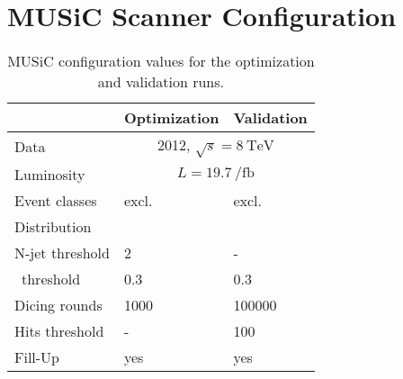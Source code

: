 \section*{MUSiC Scanner Configuration}
\begin{table}
	\centering
	\begin{tabular}{ l l l }
		\toprule
		& Optimization & Validation \\ 
		\midrule
		Data & \multicolumn{2}{c|}{2012, $\sqrt{s} = \SI{8}{\TeV}$} \\ 
		Luminosity & \multicolumn{2}{c|}{ $L = \SI{19.7}{\per\femto\barn}$ } \\ 
		\midrule
		Event classes & excl. & excl. \\ 
		Distribution & \sumpT & \Minv \\
		N-jet threshold & \num{2} & - \\
		\p~threshold & \num{0.3} & \num{0.3} \\
		Dicing rounds & \num{1000} & \num{100000} \\
		Hits threshold & - & \num{100} \\
		Fill-Up & yes & yes \\
		\bottomrule
	\end{tabular}
	\caption{MUSiC configuration values for the optimization and validation runs.}
	\label{tbl:music_configuration}
\end{table}

\newpage
